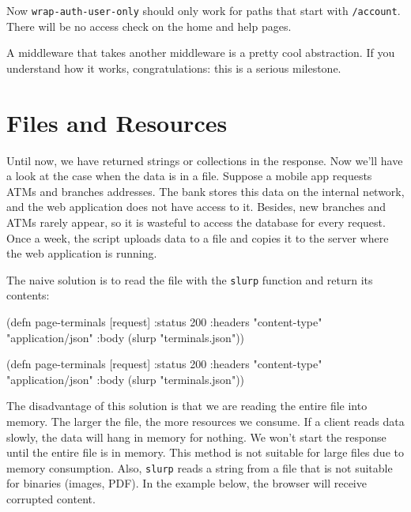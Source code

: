 Now \verb|wrap-auth-user-only| should only work for paths that start with \verb|/account|. There will be no access check on the home and help pages.

A middleware that takes another middleware is a pretty cool abstraction. If you understand how it works, congratulations: this is a serious milestone.

\section{Files and Resources}

\label{http-files}

Until now, we have returned strings or collections in the response. Now we'll have a look at the case when the data is in a file. Suppose a mobile app requests ATMs and branches addresses. The bank stores this data on the internal network, and the web application does not have access to it. Besides, new branches and ATMs rarely appear, so it is wasteful to access the database for every request. Once a week, the script uploads data to a file and copies it to the server where
the web application is running.


The naive solution is to read the file with the \verb|slurp| function and return its contents:

\ifx\DEVICETYPE\MOBILE

\begin{clojure}
(defn page-terminals [request]
  {:status 200
   :headers
   {"content-type" "application/json"}
   :body (slurp "terminals.json")})
\end{clojure}

\else

\begin{clojure}
(defn page-terminals [request]
  {:status 200
   :headers {"content-type" "application/json"}
   :body (slurp "terminals.json")})
\end{clojure}

\fi

The disadvantage of this solution is that we are reading the entire file into memory. The larger the file, the more resources we consume. If a client reads data slowly, the data will hang in memory for nothing. We won't start the response until the entire file is in memory. This method is not suitable for large files due to memory consumption. Also, \verb|slurp| reads a string from a file that is not suitable for binaries (images, PDF). In the example below, the browser will receive corrupted content.

